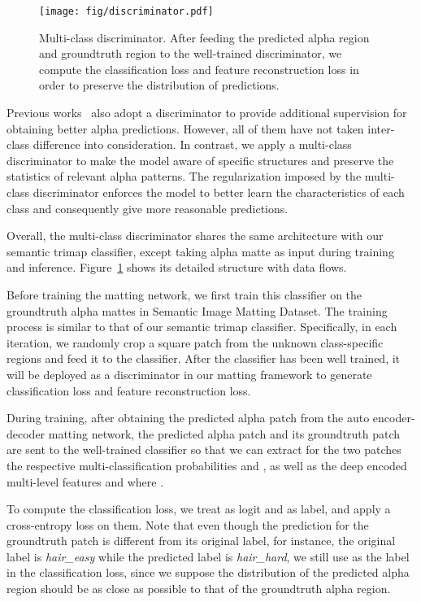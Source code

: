 \documentclass[10pt,twocolumn,letterpaper]{article}
\newcommand\cspace{15}
\begin{document}
\begin{figure}[t]
\centering 
\texttt{[image: fig/discriminator.pdf]} 
\caption{Multi-class discriminator. After feeding the predicted alpha region and groundtruth region to the well-trained discriminator, we compute the classification loss and feature reconstruction loss in order to preserve the distribution of predictions.}
\label{fig:discriminator}
\vspace{-\cspace pt}
\end{figure}

\vspace{4pt}
\label{sec:discriminator}
Previous works~\cite{Lutz2018AlphaGANGA, BMSengupta20, qiao2020attention} also adopt a discriminator to provide additional supervision for obtaining better alpha predictions. 
However, all of them have not taken inter-class difference into consideration. In contrast, we apply a multi-class discriminator to make the model aware of specific structures and preserve the statistics of relevant alpha patterns. The regularization imposed by the multi-class discriminator enforces the model to better learn the characteristics of each class and consequently give more reasonable predictions. 

Overall, the multi-class discriminator shares the same architecture with our semantic trimap classifier, except taking alpha matte as input during training and inference. Figure~\ref{fig:discriminator} shows its detailed structure with data flows. 

Before training the matting network, we first train this classifier on the groundtruth alpha mattes in Semantic Image Matting Dataset. 
The training process is similar to that of our semantic trimap classifier. Specifically, in each iteration, we randomly crop a square patch from the unknown class-specific regions and feed it to the classifier. After the classifier has been well trained, it will be deployed as a discriminator in our matting framework to generate classification loss and feature reconstruction loss.

During training, after obtaining the predicted alpha patch from the auto encoder-decoder matting network, the predicted alpha patch and its groundtruth patch are sent to the well-trained classifier so that we can extract for the two patches the respective multi-classification probabilities  and , as well as the deep encoded multi-level features  and  where . 

To compute the classification loss, we treat  as logit and  as label, and apply a cross-entropy loss on them. Note that even though the prediction for the groundtruth patch  is different from its original label, for instance, the original label is {\em hair\_easy} while the predicted label is {\em hair\_hard}, we still use  as the label in the classification loss, since we suppose the distribution of the predicted alpha region should be as close as possible to that of the groundtruth alpha region.
\end{document}
